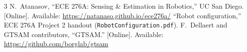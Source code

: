\documentclass[letterpaper, 10pt, conference]{ieeeconf}
\newcommand{\code}[1]{\texttt{#1}}
\begin{document}
\begin{thebibliography}{3}
 N.~Atanasov, ``ECE 276A: Sensing \& Estimation in
Robotics,'' UC San Diego. [Online]. Available:
\url{https://natanaso.github.io/ece276a/}
 ``Robot configuration,'' ECE 276A Project 2 handout
(\code{RobotConfiguration.pdf}).
 F.~Dellaert and GTSAM contributors, ``GTSAM.'' [Online].
Available: \url{https://github.com/borglab/gtsam}
\end{thebibliography}
\end{document}
